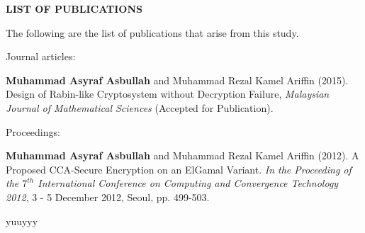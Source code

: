 \begin{center}
\normalsize{\textbf{LIST OF PUBLICATIONS}}
\end{center}



The following are the list of publications that arise from this study.

Journal articles:


\begin{hangparas}{.25in}{1}

\textbf{Muhammad Asyraf Asbullah} and Muhammad Rezal Kamel Ariffin (2015). Design of Rabin-like Cryptosystem without Decryption Failure, \textit{Malaysian Journal of Mathematical Sciences} (Accepted for Publication).

\end{hangparas}

	


Proceedings:

\begin{hangparas}{.25in}{1}
 \textbf{Muhammad Asyraf Asbullah} and Muhammad Rezal Kamel Ariffin (2012). A Proposed CCA-Secure Encryption on an ElGamal Variant. \textit{In the Proceeding of the $7^{th}$ International Conference on Computing and Convergence Technology 2012}, 3 - 5 December 2012, Seoul, pp. 499-503.
 







yuuyyy
\end{hangparas}



\newpage
\thispagestyle{empty}
\cleardoublepage
